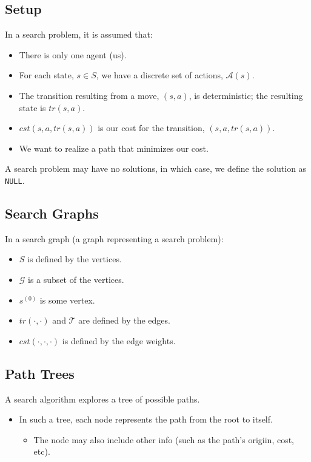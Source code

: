 \subsection{Setup}
\begin{definition} In a search problem, it is assumed that: 
    \begin{itemize}
        \item There is only one agent (us).
        \item For each state, $s \in S$, we have a discrete set of actions, $\mathcal{A}(s)$.
        \item The transition resulting from a move, $(s, a)$, is deterministic; the resulting state is $tr(s, a)$.
        \item $cst(s, a, tr(s, a))$ is our cost for the transition, $(s, a, tr(s, a))$.
        \item We want to realize a path that minimizes our cost.
    \end{itemize}
    
    A search problem may have no solutions, in which case, we define the solution as \texttt{NULL}.
\end{definition}

\subsection{Search Graphs}
\begin{definition}
    In a search graph (a graph representing a search problem):
    \begin{itemize}
        \item $S$ is defined by the vertices.
        \item $\mathcal{G}$ is a subset of the vertices.
        \item $s^{(0)}$ is some vertex.
        \item $tr(\cdot, \cdot)$ and $\mathcal{T}$ are defined by the edges.
        \item $cst(\cdot, \cdot, \cdot)$ is defined by the edge weights.
    \end{itemize}
\end{definition}

\subsection{Path Trees}
\begin{definition}
    A search algorithm explores a tree of possible paths. 
    \begin{itemize}
        \item In such a tree, each node represents the path from the root to itself.
        \begin{itemize}
            \item The node may also include other info (such as the path's origiin, cost, etc).
        \end{itemize}
    \end{itemize}
\end{definition}

